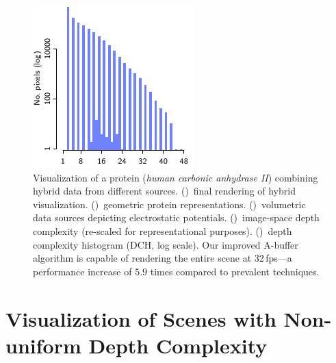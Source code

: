\documentclass{egpubl}
\newcommand{\ab}{\mbox{A-buffer}}
\newcommand{\dch}{DCH}
\newlength{\boxheight}
\begin{document}
\begin{figure}[tcb]
\begin{minipage}[b][\boxheight][b]{0.24\linewidth}
\begin{minipage}[b]{0.98\linewidth}
      \includegraphics[width=1\linewidth]{figures/plot-dch-mol}\vspace{-2mm}
      \subcaption{\label{fig:sub:protein-dch}%
        \dch{} (log scale)%
      }
    \end{minipage}%
  \end{minipage}%
  \caption{\label{fig:protein}%
    Visualization of a protein (\emph{human carbonic anhydrase II}) combining hybrid data from different sources.
    ()~final rendering of hybrid visualization.
    ()~geometric protein representations. 
    ()~volumetric data sources depicting electrostatic potentials. 
    ()~image-space depth complexity (re-scaled for representational purposes). 
    ()~depth complexity histogram (DCH, log scale). %
    Our improved \ab{} algorithm is capable of rendering the entire scene at 32\,fps---a performance increase of $5.9$ times compared to prevalent techniques. %
  }
\end{figure}



\section{Visualization of Scenes with Non-uniform Depth Complexity}
\label{sec:depthcomplexity}
\end{document}
